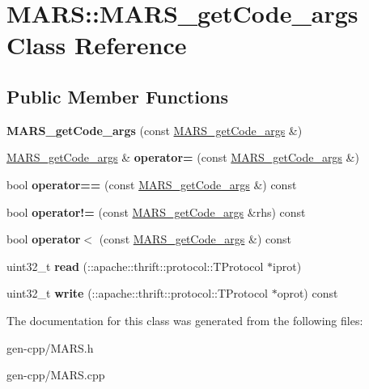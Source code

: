 \hypertarget{classMARS_1_1MARS__getCode__args}{}\section{M\+A\+RS\+:\+:M\+A\+R\+S\+\_\+get\+Code\+\_\+args Class Reference}
\label{classMARS_1_1MARS__getCode__args}
\subsection*{Public Member Functions}
\begin{DoxyCompactItemize}
\item 
\mbox{\label{classMARS_1_1MARS__getCode__args_a98c32ba2c7415512e87088bfb02838e3}} 
{\bfseries M\+A\+R\+S\+\_\+get\+Code\+\_\+args} (const \hyperlink{classMARS_1_1MARS__getCode__args}{M\+A\+R\+S\+\_\+get\+Code\+\_\+args} \&)
\item 
\mbox{\label{classMARS_1_1MARS__getCode__args_abf1b0524b84708a105a766ea6fdee220}} 
\hyperlink{classMARS_1_1MARS__getCode__args}{M\+A\+R\+S\+\_\+get\+Code\+\_\+args} \& {\bfseries operator=} (const \hyperlink{classMARS_1_1MARS__getCode__args}{M\+A\+R\+S\+\_\+get\+Code\+\_\+args} \&)
\item 
\mbox{\label{classMARS_1_1MARS__getCode__args_a538f5b261df08d963a02673b40d2cd2e}} 
bool {\bfseries operator==} (const \hyperlink{classMARS_1_1MARS__getCode__args}{M\+A\+R\+S\+\_\+get\+Code\+\_\+args} \&) const
\item 
\mbox{\label{classMARS_1_1MARS__getCode__args_a2ea346271af181ad82ea513ec33223a1}} 
bool {\bfseries operator!=} (const \hyperlink{classMARS_1_1MARS__getCode__args}{M\+A\+R\+S\+\_\+get\+Code\+\_\+args} \&rhs) const
\item 
\mbox{\label{classMARS_1_1MARS__getCode__args_a30b1d9ebc0de427fc01f9c43e2932a4c}} 
bool {\bfseries operator$<$} (const \hyperlink{classMARS_1_1MARS__getCode__args}{M\+A\+R\+S\+\_\+get\+Code\+\_\+args} \&) const
\item 
\mbox{\label{classMARS_1_1MARS__getCode__args_a9b6e0b5c816f90646a11e33d0bd1aee2}} 
uint32\+\_\+t {\bfseries read} (\+::apache\+::thrift\+::protocol\+::\+T\+Protocol $\ast$iprot)
\item 
\mbox{\label{classMARS_1_1MARS__getCode__args_a8f08cc0c9f18499b551200d9674e9ac2}} 
uint32\+\_\+t {\bfseries write} (\+::apache\+::thrift\+::protocol\+::\+T\+Protocol $\ast$oprot) const
\end{DoxyCompactItemize}


The documentation for this class was generated from the following files\+:\begin{DoxyCompactItemize}
\item 
gen-\/cpp/M\+A\+R\+S.\+h\item 
gen-\/cpp/M\+A\+R\+S.\+cpp\end{DoxyCompactItemize}
